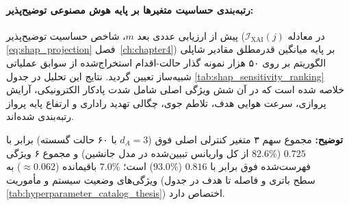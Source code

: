 \documentclass[oneside,openany,phd]{TMU-Thesis}
\begin{document}
\paragraph{رتبه‌بندی حساسیت متغیرها بر پایه هوش مصنوعی توضیح‌پذیر:}
پیش از ارزیابی عددی بعد $m$، شاخص حساسیت توضیح‌پذیر ($\mathcal{I}_{\text{XAI}}(j)$ در معادله \ref{eq:shap_projection} فصل~\ref{ch:chapter4}) بر پایه میانگین قدرمطلق مقادیر شاپلی الگوریتم  بر روی ۵۰ هزار نمونه گذار حالت-اقدام استخراج‌شده از سوابق عملیاتی شبیه‌ساز  تعیین گردید. نتایج این تحلیل در جدول \ref{tab:shap_sensitivity_ranking} خلاصه شده است که در آن شش ویژگی اصلی شامل شدت پادکار الکترونیکی، آرایش پروازی، سرعت هوایی هدف، تلاطم جوی، چگالی تهدید راداری و ارتفاع پایه پرواز رتبه‌بندی شده‌اند.

\begin{table}[htbp]
\caption{رتبه‌بندی ابعاد تصمیم و حساسیت متغیرها در پیش‌بینی نقض قیود پروازی بر پایه میانگین مقادیر شاپلی در سوابق عملیاتی }
\label{tab:shap_sensitivity_ranking}
\centering
\small
{}
\smallskip
\parbox{\linewidth}{\scriptsize \textbf{توضیح:} مجموع سهم ۳ متغیر کنترلی اصلی فوق ($d_A = 3$ با ۶۰ حالت گسسته) برابر با $0.725$ ($82.6\%$ از کل واریانس تبیین‌شده در مدل جانشین) و مجموع ۶ ویژگی فهرست‌شده فوق برابر با $0.816$ ($93.0\%$) است؛ $7.0\%$ باقیمانده ($\approx 0.062$) به ویژگی‌های وضعیت سیستم و مأموریت (سطح باتری و فاصله تا هدف در جدول \ref{tab:hyperparameter_catalog_thesis}) اختصاص دارد.}
\end{table}
\end{document}
